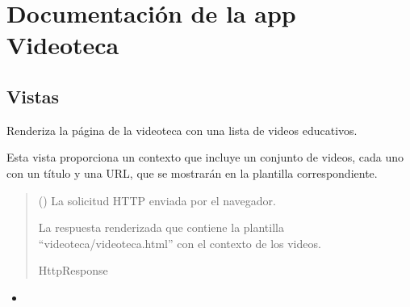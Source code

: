 \documentclass[letterpaper,10pt,spanish]{sphinxmanual}
\begin{document}
\sphinxstepscope


\chapter{Documentación de la app Videoteca}
\label{\detokenize{videoteca:documentacion-de-la-app-videoteca}}\label{\detokenize{videoteca::doc}}

\section{Vistas}
\label{\detokenize{videoteca:vistas}}

\begin{fulllineitems}

\pysigstartsignatures
{}
\pysigstopsignatures
\sphinxAtStartPar
Renderiza la página de la videoteca con una lista de videos educativos.

\sphinxAtStartPar
Esta vista proporciona un contexto que incluye un conjunto de videos, cada uno
con un título y una URL, que se mostrarán en la plantilla correspondiente.
\begin{quote}\begin{description}
\sphinxAtStartPar
{} () \textendash{} La solicitud HTTP enviada por el navegador.

\sphinxAtStartPar
La respuesta renderizada que contiene la plantilla
“videoteca/videoteca.html” con el contexto de los videos.

\sphinxAtStartPar
HttpResponse

\end{description}\end{quote}

\end{fulllineitems}

\begin{itemize}
\item {} 
\sphinxAtStartPar
{}

\end{itemize}



\renewcommand{\indexname}{Índice}
\printindex
\end{document}
